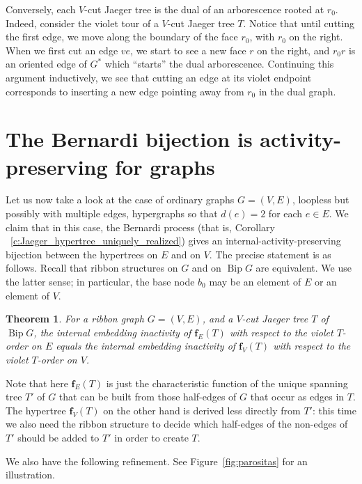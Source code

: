 \documentclass[10pt]{amsart}
\newtheorem{theo}{Theorem}[section]
\theoremstyle{definition}\newtheorem{defi}[theo]{Definition}
\theoremstyle{remark}\newtheorem{rema}[theo]{Remark}
\DeclareMathOperator{\bip}{Bip}
\begin{document}
Conversely, each $V$-cut Jaeger tree is the dual of an arborescence rooted at $r_0$. Indeed, consider the violet tour of a $V$-cut Jaeger tree $T$. Notice that until cutting the first edge, we move along the boundary of the face $r_0$, with $r_0$ on the right. When we first cut an edge $ve$, we start to see a new face $r$ on the right, and $r_0r$ is an oriented edge of $G^*$ which ``starts'' the dual arborescence. Continuing this argument inductively, we see that cutting an edge at its violet endpoint corresponds to inserting a new edge pointing away from $r_0$ in the dual graph.



\appendix

\section{The Bernardi bijection is activity-preserving for graphs} \label{sec:act_preserv_for_graphs}

Let us now take a look at the case of ordinary graphs $G=(V,E)$, loopless but possibly with multiple edges, \ie hypergraphs so that $d(e)=2$ for each $e\in E$. We claim that in this case, the Bernardi process (that is, Corollary ~\ref{c:Jaeger_hypertree_uniquely_realized}) gives an internal-activity-preserving bijection between the hypertrees on $E$ and on $V$. The precise statement is as follows. Recall that ribbon structures on $G$ and on $\bip G$ are equivalent. We use the latter sense; in particular, the base node $b_0$ may be an element of $E$ or an element of $V$.

\begin{theo}\label{thm:Bernardi_activity_preserving_graph}
For a ribbon graph $G=(V,E)$, and a $V$-cut Jaeger tree $T$ of $\bip G$, the internal embedding inactivity of $\mathbf f_E(T)$ with respect to the violet $T$-order on $E$ equals the internal embedding inactivity of $\mathbf f_V(T)$ with respect to the violet $T$-order on $V$. 
\end{theo}

Note that here $\mathbf f_E(T)$ is just the characteristic function of the unique spanning tree $T'$ of $G$ that can be built from those half-edges of $G$ that occur as edges in $T$. The hypertree $\mathbf f_V(T)$ on the other hand is derived less directly from $T'$: this time we also need the ribbon structure to decide which half-edges of the non-edges of $T'$ should be added to $T'$ in order to create $T$. 

We also have the following refinement. See Figure~\ref{fig:parositas} for an illustration.
\end{document}

